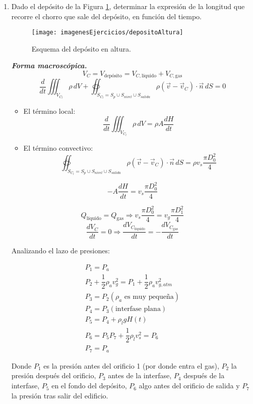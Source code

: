 \begin{enumerate}
\newpage
\item Dado el depósito de la Figura \ref{fig:depositoaltura}, determinar la expresión de la longitud que recorre el chorro que sale del depósito, en función del tiempo.
\begin{figure}[H]
	\centering
	\texttt{[image: imagenesEjercicios/depositoAltura]}
	\caption{Esquema del depósito en altura.}
	\label{fig:depositoaltura}
\end{figure}

\blue
\textit{\textbf{Forma macroscópica.}}
\[V_C = V_{\text{depósito}} = V_{C, \text{líquido}} + V_{C, \text{gas}}\]
\[\dfrac{d}{dt} \iiint_{V_{C_l}} \rho\,dV + \oiint_{S_{C_l} = S_p \cup S_{nivel} \cup S_{salida}} \rho (\vec{v}-\vec{v}_C) \cdot \vec{n}\,dS=0\]

\begin{itemize}
	\item El término local:
	\[\dfrac{d}{dt} \iiint_{V_{C_l}} \rho\,dV = \rho A \dfrac{dH}{dt}\]
	\item El término convectivo:
	\[\oiint_{S_{C_l} = S_p \cup S_{nivel} \cup S_{salida}} \rho (\vec{v}-\vec{v}_C) \cdot \vec{n}\,dS=\rho v_s \dfrac{\pi D_0^2}{4}\]
\end{itemize}

\[-A\dfrac{dH}{dt} = v_s\dfrac{\pi D_0^2}{4}\]

\[Q_{\text{líquido}} = Q_{\text{gas}} \Rightarrow v_s\dfrac{\pi D_0^2}{4} = v_g\dfrac{\pi D_1^2}{4}\]
\[\dfrac{dV_C}{dt} = 0 \Rightarrow \dfrac{dV_{C_{\text{líquido}}}}{dt} = -\dfrac{dV_{C_{\text{gas}}}}{dt}\]

Analizando el lazo de presiones:

\[
	\begin{matrix}
		P_1 = P_a\\
		P_2 + \dfrac{1}{2}\rho_a v_g^2 = P_1 + \dfrac{1}{2}\rho_a v_{g,atm}^2\\
		P_3 = P_2(\rho_a \text{ es muy pequeña})\\
		P_4 = P_3 (\text{interfase plana})\\
		P_5 = P_4 + \rho_l g H(t)\\
		P_6 = P_5
		P_7 + \dfrac{1}{2} \rho_l v_s^2 = P_6\\
		P_7 = P_a
	\end{matrix}
\]

Donde $P_1$ es la presión antes del orificio 1 (por donde entra el gas), $P_2$ la presión después del orificio, $P_3$ antes de la interfase, $P_4$ después de la interfase, $P_5$ en el fondo del depósito, $P_6$ algo antes del orificio de salida y $P_7$ la presión tras salir del edificio.



\end{enumerate}
